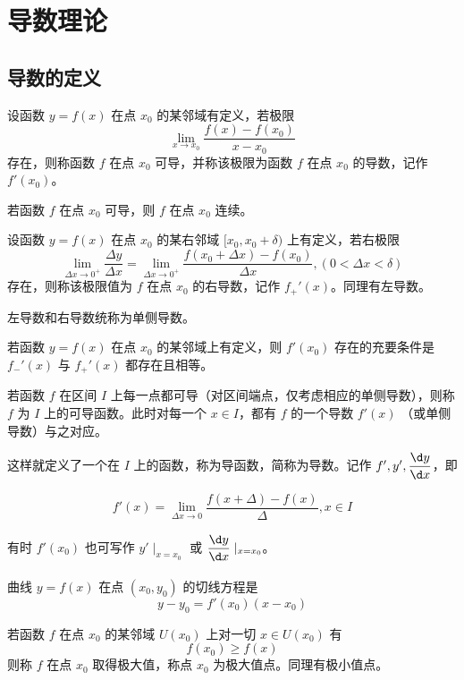 
\chapter{导数理论}

\section{导数的定义}

\begin{definition}
	设函数 $y=f(x)$ 在点 $x_0$ 的某邻域有定义，若极限
	\[ \lim_{x\to x_0}\frac{f(x)-f(x_0)}{x-x_0} \]
	存在，则称函数 $f$ 在点 $x_0$ 可导，并称该极限为函数 $f$ 在点 $x_0$ 的导数，记作 $f'(x_0)$。
\end{definition}

\begin{theorem}
	若函数 $f$ 在点 $x_0$ 可导，则 $f$ 在点 $x_0$ 连续。
\end{theorem}

\begin{definition}
	设函数 $y=f(x)$ 在点 $x_0$ 的某右邻域 $[x_0,x_0+\delta)$ 上有定义，若右极限
	\[ \lim_{\Delta x\to 0^+}\frac{\Delta y}{\Delta x} = \lim_{\Delta x\to 0^+}\frac{f(x_0+\Delta x)-f(x_0)}{\Delta x},(0<\Delta x<\delta) \]
	存在，则称该极限值为 $f$ 在点 $x_0$ 的右导数，记作 $f_+'(x)$。同理有左导数。
\end{definition}

左导数和右导数统称为单侧导数。

\begin{theorem}
	若函数 $y=f(x)$ 在点 $x_0$ 的某邻域上有定义，则 $f'(x_0)$ 存在的充要条件是 $f_-'(x)$ 与 $f_+'(x)$ 都存在且相等。
\end{theorem}

若函数 $f$ 在区间 $I$ 上每一点都可导（对区间端点，仅考虑相应的单侧导数），则称 $f$ 为 $I$ 上的可导函数。此时对每一个 $x\in I$，都有 $f$ 的一个导数 $f'(x)$ （或单侧导数）与之对应。

这样就定义了一个在 $I$ 上的函数，称为导函数，简称为导数。记作 $f',y',\dfrac{\d y}{\d x}$，即

$$f'(x) = \lim_{\Delta x \to 0}\frac{f(x+\Delta)-f(x)}{\Delta},x\in I$$

有时 $f'(x_0)$ 也可写作 $y'\mid_{x=x_0}$ 或 $\mfrac{\d y}{\d x}\mid_{x=x_0}$。

曲线 $y = f(x)$ 在点 $(x_0,y_0)$ 的切线方程是
$$y-y_0 = f'(x_0)(x-x_0)$$

\begin{definition}
	若函数 $f$ 在点 $x_0$ 的某邻域 $U(x_0)$ 上对一切 $x\in U(x_0)$ 有
	\[ f(x_0) \geqslant f(x) \]
	则称 $f$ 在点 $x_0$ 取得极大值，称点 $x_0$ 为极大值点。同理有极小值点。
\end{definition}

